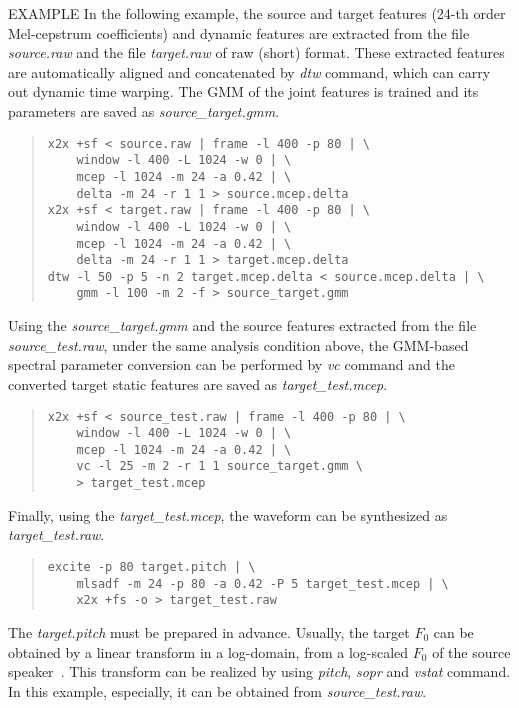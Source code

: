 \begin{qsection}{EXAMPLE}
In the following example, the source and target features (24-th order Mel-cepstrum
coefficients) and dynamic features are extracted from 
the file {\em source.raw} and the file {\em target.raw} of raw (short) format.  
These extracted features are automatically aligned and concatenated 
by {\em dtw} command, which can carry out dynamic time warping.  
The GMM of the joint features is trained and its parameters are saved
as {\em source\_target.gmm}.
\begin{quote}
\verb!x2x +sf < source.raw | frame -l 400 -p 80 | \! \\
\verb!    window -l 400 -L 1024 -w 0 | \! \\
\verb!    mcep -l 1024 -m 24 -a 0.42 | \! \\
\verb!    delta -m 24 -r 1 1 > source.mcep.delta !  \\
\verb!x2x +sf < target.raw | frame -l 400 -p 80 | \! \\
\verb!    window -l 400 -L 1024 -w 0 | \! \\
\verb!    mcep -l 1024 -m 24 -a 0.42 | \! \\
\verb!    delta -m 24 -r 1 1 > target.mcep.delta ! \\
\verb!dtw -l 50 -p 5 -n 2 target.mcep.delta < source.mcep.delta | \! \\
\verb!    gmm -l 100 -m 2 -f > source_target.gmm!
\end{quote}
Using the {\em source\_target.gmm} and the source features extracted from the file
{\em source\_test.raw}, under the same analysis condition above, the GMM-based
spectral parameter conversion can be performed by {\em vc} command and the converted
target static features are saved as {\em target\_test.mcep}.
\begin{quote}
\verb!x2x +sf < source_test.raw | frame -l 400 -p 80 | \! \\
\verb!    window -l 400 -L 1024 -w 0 | \! \\
\verb!    mcep -l 1024 -m 24 -a 0.42 | \! \\
\verb!    vc -l 25 -m 2 -r 1 1 source_target.gmm \! \\
\verb!    > target_test.mcep!
\end{quote}
Finally, using the {\em target\_test.mcep}, the waveform can be synthesized as {\em
 target\_test.raw}.
\begin{quote}
\verb!excite -p 80 target.pitch | \! \\
\verb!    mlsadf -m 24 -p 80 -a 0.42 -P 5 target_test.mcep | \! \\
\verb!    x2x +fs -o > target_test.raw!
\end{quote}
The {\em target.pitch} must be prepared in advance.  Usually, the target $F_0$ can be
obtained by a linear transform in a log-domain, from a log-scaled $F_0$ of the source
speaker~\cite{ref:vc-IEEETASLP}.  This transform can be realized by using {\em
pitch}, {\em sopr} and {\em vstat} command.  In this example, especially, it can be
obtained from {\em source\_test.raw}.
\end{qsection}

